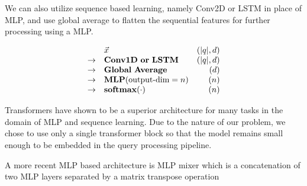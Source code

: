 \documentclass[conference]{IEEEtran}
\begin{document}
We can also utilize sequence based learning, namely Conv2D or LSTM in place
of MLP, and use global average to flatten the sequential features for further processing using a MLP.

$$
\begin{array}{rlr}
&\vec x  & (|q|, d) \\
\to & \mathbf{Conv1D\ or\ LSTM} & (|q|, d) \\
\to & \mathbf{Global\ Average} & (d)\\
\to & \mathbf{MLP}(\makebox{output-dim}=n) & (n) \\
\to & \mathbf{softmax}(\cdot) & (n) \\
\end{array}
$$


Transformers have shown to be a superior architecture for many tasks in the domain of MLP and sequence learning.  Due to the nature of our problem, we chose to use only a single transformer block so that the model remains small enough to be embedded in the query processing pipeline.

A more recent MLP based architecture is MLP mixer which is a concatenation of two MLP layers separated by a matrix transpose operation
\end{document}
